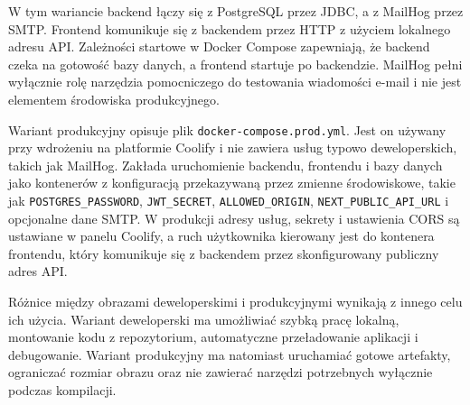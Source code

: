 W tym wariancie backend łączy się z PostgreSQL przez JDBC, a z MailHog przez SMTP. Frontend komunikuje się z backendem przez HTTP z użyciem lokalnego adresu API. Zależności startowe w Docker Compose zapewniają, że backend czeka na gotowość bazy danych, a frontend startuje po backendzie. MailHog pełni wyłącznie rolę narzędzia pomocniczego do testowania wiadomości e-mail i nie jest elementem środowiska produkcyjnego.

Wariant produkcyjny opisuje plik \texttt{docker-compose.prod.yml}. Jest on używany przy wdrożeniu na platformie Coolify i nie zawiera usług typowo deweloperskich, takich jak MailHog. Zakłada uruchomienie backendu, frontendu i bazy danych jako kontenerów z konfiguracją przekazywaną przez zmienne środowiskowe, takie jak \texttt{POSTGRES\_PASSWORD}, \texttt{JWT\_SECRET}, \texttt{ALLOWED\_ORIGIN}, \texttt{NEXT\_PUBLIC\_API\_URL} i opcjonalne dane SMTP. W produkcji adresy usług, sekrety i ustawienia CORS są ustawiane w panelu Coolify, a ruch użytkownika kierowany jest do kontenera frontendu, który komunikuje się z backendem przez skonfigurowany publiczny adres API.

Różnice między obrazami deweloperskimi i produkcyjnymi wynikają z innego celu ich użycia. Wariant deweloperski ma umożliwiać szybką pracę lokalną, montowanie kodu z repozytorium, automatyczne przeładowanie aplikacji i debugowanie. Wariant produkcyjny ma natomiast uruchamiać gotowe artefakty, ograniczać rozmiar obrazu oraz nie zawierać narzędzi potrzebnych wyłącznie podczas kompilacji.

